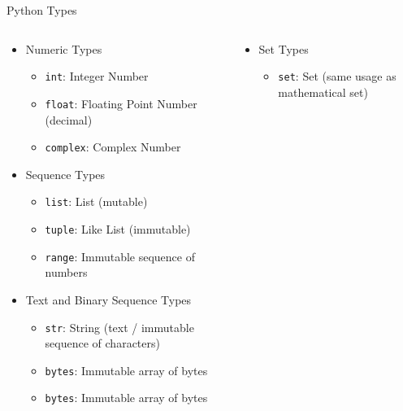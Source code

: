 \documentclass[aspectratio=169]{beamer}
\begin{document}
\begin{frame}{Python Types}

    \begin{columns}
        \begin{column}{0.5\textwidth}
            \begin{itemize}
                \item Numeric Types
                      \begin{itemize}
                          \item \texttt{int}: Integer Number
                          \item \texttt{float}: Floating Point Number (decimal)
                          \item \texttt{complex}: Complex Number
                      \end{itemize}
                \item Sequence Types
                      \begin{itemize}
                          \item \texttt{list}: List (mutable)
                          \item \texttt{tuple}: Like List (immutable)
                          \item \texttt{range}: Immutable sequence of numbers
                      \end{itemize}

                \item Text and Binary Sequence Types
                      \begin{itemize}
                          \item \texttt{str}: String (text / immutable sequence of characters)                          \item \texttt{bytes}: Immutable array of bytes
                          \item \texttt{bytes}: Immutable array of bytes
                      \end{itemize}
            \end{itemize}

        \end{column}
        \begin{column}{0.5\textwidth}
            \begin{itemize}

                \item Set Types
                      \begin{itemize}
                          \item \texttt{set}: Set (same usage as mathematical set)
                      \end{itemize}


\end{itemize}
\end{column}
\end{columns}
\end{frame}
\end{document}
